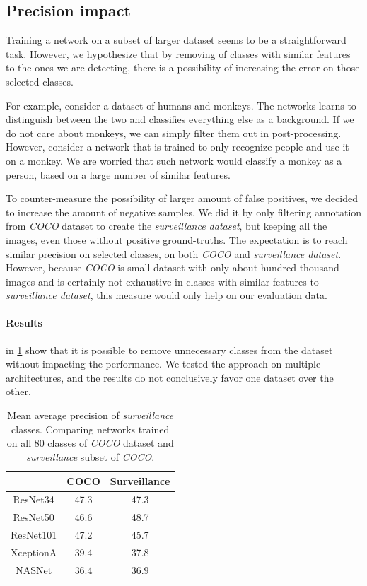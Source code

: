 \subsection{Precision impact}
Training a network on a subset of larger dataset seems to be a straightforward task. However, we hypothesize that by removing of classes with similar features to the ones we are detecting, there is a possibility of increasing the error on those selected classes. 

For example, consider a dataset of humans and monkeys. The networks learns to distinguish between the two and classifies everything else as a background. If we do not care about monkeys, we can simply filter them out in post-processing. However, consider a network that is trained to only recognize people and use it on a monkey. We are worried that such network would classify a monkey as a person, based on a large number of similar features. 

To counter-measure the possibility of larger amount of false positives, we decided to increase the amount of negative samples. We did it by only filtering annotation from \textit{COCO} dataset to create the \textit{surveillance dataset}, but keeping all the images, even those without positive ground-truths. The expectation is to reach similar precision on selected classes, on both \textit{COCO} and \textit{surveillance dataset}. However, because \textit{COCO} is small dataset with only about hundred thousand images and is certainly not exhaustive in classes with similar features to \textit{surveillance dataset}, this measure would only help on our evaluation data.

\paragraph{Results} in \cref{tab:ssdcocosurv} show that it is possible to remove unnecessary classes from the dataset without impacting the performance. We tested the approach on multiple architectures, and the results do not conclusively favor one dataset over the other. 

\begin{table}[]
    \centering
    \begin{tabular}{c|c|c}
         & COCO & Surveillance  \\
         \hline
        ResNet34 & 47.3 & 47.3 \\
        ResNet50 & 46.6 & 48.7 \\
        ResNet101 & 47.2 & 45.7 \\
        XceptionA & 39.4 & 37.8 \\
        NASNet & 36.4 & 36.9 
    \end{tabular}
    \caption[SSD's precision comparison between COCO and surveillance datasets]{Mean average precision of \textit{surveillance} classes. Comparing networks trained on all 80 classes of \textit{COCO} dataset and \textit{surveillance} subset of \textit{COCO}.}
    \label{tab:ssdcocosurv}
\end{table}

